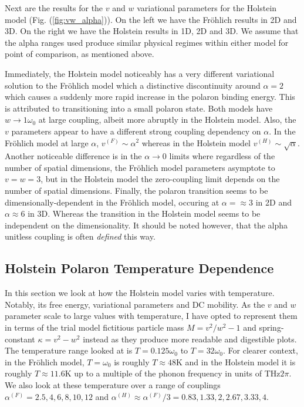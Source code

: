 Next are the results for the $v$ and $w$ variational parameters for the Holstein model (Fig. (\ref{fig:vw_alpha})). On the left we have the Fr\"ohlich results in 2D and 3D. On the right we have the Holstein results in 1D, 2D and 3D. We assume that the alpha ranges used produce similar physical regimes within either model for point of comparison, as mentioned above.
\newline

Immediately, the Holstein model noticeably has a very different variational solution to the Fr\"ohlich model which a distinctive discontinuity around $\alpha = 2$ which causes a suddenly more rapid increase in the polaron binding energy. This is attributed to transitioning into a small polaron state. Both models have $w \to 1 \omega_0$ at large coupling, albeit more abruptly in the Holstein model. Also, the $v$ parameters appear to have a different strong coupling dependency on $\alpha$. In the Fr\"ohlich model at large $\alpha$, $v^{(F)} \sim \alpha^2$ whereas in the Holstein model $v^{(H)} \sim \sqrt{\alpha}$. Another noticeable difference is in the $\alpha \to 0$ limits where regardless of the number of spatial dimensions, the Fr\"ohlich model parameters asymptote to $v = w = 3$, but in the Holstein model the zero-coupling limit depends on the number of spatial dimensions. Finally, the polaron transition seems to be dimensionally-dependent in the Fr\"ohlich model, occuring at $\alpha = \approx 3$ in 2D and $\alpha \approx 6$ in 3D. Whereas the transition in the Holstein model seems to be independent on the dimensionality. It should be noted however, that the alpha unitless coupling is often \emph{defined} this way.

\subsection{Holstein Polaron Temperature Dependence}

In this section we look at how the Holstein model varies with temperature. Notably, its free energy, variational parameters and DC mobility. As the $v$ and $w$ parameter scale to large values with temperature, I have opted to represent them in terms of the trial model fictitious particle mass $M = v^2 / w^2 - 1$ and spring-constant $\kappa = v^2 - w^2$ instead as they produce more readable and digestible plots. The temperature range looked at is $T = 0.125 \omega_0$ to $T = 32 \omega_0$. For clearer context, in the Fr\"ohlich model, $T = \omega_0$ is roughly $T \approx 48 $K
and in the Holstein model it is roughly $T \approx 11.6 $K up to a multiple of the phonon frequency in units of THz$2\pi$. We also look at these temperature over a range of couplings $\alpha^{(F)} = 2.5, 4, 6, 8, 10, 12$ and $\alpha^{(H)} \approx \alpha^{(F)} / 3 = 0.83, 1.33, 2, 2.67, 3.33, 4$.

